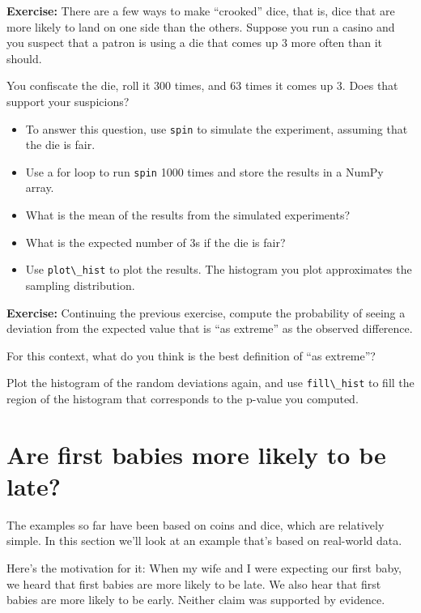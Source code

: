 \textbf{Exercise:} There are a few ways to make ``crooked'' dice, that
is, dice that are more likely to land on one side than the others.
Suppose you run a casino and you suspect that a patron is using a die
that comes up 3 more often than it should.

You confiscate the die, roll it 300 times, and 63 times it comes up 3.
Does that support your suspicions?

\begin{itemize}
\item
  To answer this question, use \passthrough{\lstinline!spin!} to
  simulate the experiment, assuming that the die is fair.
\item
  Use a for loop to run \passthrough{\lstinline!spin!} 1000 times and
  store the results in a NumPy array.
\item
  What is the mean of the results from the simulated experiments?
\item
  What is the expected number of 3s if the die is fair?
\item
  Use \passthrough{\lstinline!plot\_hist!} to plot the results. The
  histogram you plot approximates the sampling distribution.
\end{itemize}

\textbf{Exercise:} Continuing the previous exercise, compute the
probability of seeing a deviation from the expected value that is ``as
extreme'' as the observed difference.

For this context, what do you think is the best definition of ``as
extreme''?

Plot the histogram of the random deviations again, and use
\passthrough{\lstinline!fill\_hist!} to fill the region of the histogram
that corresponds to the p-value you computed.

\hypertarget{are-first-babies-more-likely-to-be-late}{%
\section{Are first babies more likely to be
late?}\label{are-first-babies-more-likely-to-be-late}}

The examples so far have been based on coins and dice, which are
relatively simple. In this section we'll look at an example that's based
on real-world data.

Here's the motivation for it: When my wife and I were expecting our
first baby, we heard that first babies are more likely to be late. We
also hear that first babies are more likely to be early. Neither claim
was supported by evidence.

